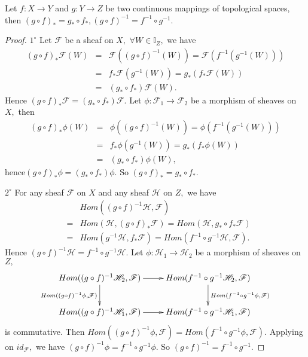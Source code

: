 \begin{cor}
Let $f: X\rightarrow Y$ and $g: Y\rightarrow Z$ be two continuous
mappings of topological spaces, then $(g\circ f)_{\ast} =
g_{\ast}\circ f_{\ast}, (g\circ f)^{-1} = f^{-1}\circ g^{-1}.$
\end{cor}
\begin{proof}
$\mathit{1^{\circ}}$ Let $\mathscr{F}$ be a sheaf on $X,$ $\forall
W\in \mathds{I}_Z,$ we have
\begin{eqnarray*}
(g\circ f)_{\ast}\mathscr{F}(W) & = & \mathscr{F}((g\circ
f)^{-1}(W)) = \mathscr{F}(f^{-1}(g^{-1}(W)))    \\
& = & f_{\ast}\mathscr{F}(g^{-1}(W)) =
g_{\ast}(f_{\ast}\mathscr{F}(W))     \\
& = & (g_{\ast}\circ f_{\ast})\mathscr{F}(W).
\end{eqnarray*}
Hence $(g\circ f)_{\ast}\mathscr{F} = (g_{\ast}\circ
f_{\ast})\mathscr{F}.$ Let $\phi: \mathscr{F}_1\rightarrow
\mathscr{F}_2$ be a morphism of sheaves on $X,$ then
\begin{eqnarray*}
(g\circ f)_{\ast}\phi(W) & = & \phi((g\circ f)^{-1}(W)) =
\phi(f^{-1}(g^{-1}(W)))    \\
& = & f_{\ast}\phi(g^{-1}(W)) = g_{\ast}(f_{\ast}\phi(W)) \\
& = & (g_{\ast}\circ f_{\ast})\phi(W),
\end{eqnarray*}
hence$(g\circ f)_{\ast}\phi = (g_{\ast}\circ f_{\ast})\phi.$ So
$(g\circ f)_{\ast} = g_{\ast}\circ f_{\ast}.$

$\mathit{2^{\circ}}$ For any sheaf $\mathscr{F}$ on $X$ and any
sheaf $\mathscr{H}$ on $Z,$ we have
\begin{eqnarray*}
& & Hom((g\circ f)^{-1}\mathscr{H}, \mathscr{F})    \\
& = & Hom(\mathscr{H}, (g\circ f)_{\ast}\mathscr{F}) =
Hom(\mathscr{H}, g_{\ast}\circ f_{\ast}\mathscr{F}) \\
& = & Hom(g^{-1}\mathscr{H}, f_{\ast}\mathscr{F}) = Hom(f^{-1}\circ
g^{-1}\mathscr{H}, \mathscr{F}).
\end{eqnarray*}
Hence $(g\circ f)^{-1}\mathscr{H} = f^{-1}\circ g^{-1}\mathscr{H}.$
Let $\phi: \mathscr{H}_1\rightarrow \mathscr{H}_2$ be a morphism of
sheaves on $Z,$
\[ \xymatrix{
   Hom((g\circ f)^{-1}\mathscr{H}_2, \mathscr{F}) \ar[r] \ar[d]_{Hom((g\circ f)^{-1}\phi,
   \mathscr{F})} & Hom(f^{-1}\circ g^{-1}\mathscr{H}_2, \mathscr{F})
   \ar[d]^{Hom(f^{-1}\circ g^{-1}\phi, \mathscr{F})}              \\
   Hom((g\circ f)^{-1}\mathscr{H}_1, \mathscr{F}) \ar[r] & Hom(f^{-1}\circ g^{-1}\mathscr{H}_1,
   \mathscr{F}) }  \]
is commutative. Then $Hom((g\circ f)^{-1}\phi, \mathscr{F}) =
Hom(f^{-1}\circ g^{-1}\phi, \mathscr{F}).$ Applying on
$id_{\mathscr{F}},$ we have $(g\circ f)^{-1}\phi = f^{-1}\circ
g^{-1}\phi.$ So $(g\circ f)^{-1} = f^{-1}\circ g^{-1}.$
\end{proof}
